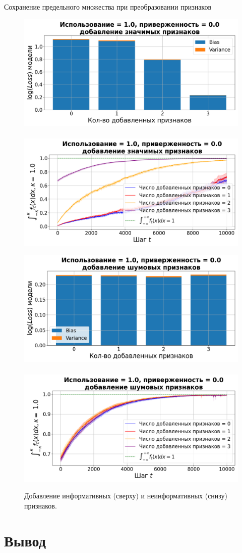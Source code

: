 \documentclass[aspectratio=169]{beamer}
\begin{document}
    \begin{frame}{Сохранение предельного множества при преобразовании признаков}
        \footnotesize
        \vspace{-3mm}
        \begin{figure}
            \centering
            \includegraphics[width=0.45\linewidth]{pictures/conf_bvl_aif_1.0_0.0.png}~
            \includegraphics[width=0.45\linewidth]{pictures/conf_delta_aif_1.0_0.0.png}

            \includegraphics[width=0.45\linewidth]{pictures/conf_bvl_anf_1.0_0.0.png}~
            \includegraphics[width=0.45\linewidth]{pictures/conf_delta_anf_1.0_0.0.png}
            \vspace{-3mm}
            \caption{Добавление информативных (сверху) и неинформативных (снизу) признаков.}
        \end{figure}
    \end{frame}

\section{Вывод}
    
\end{document}
